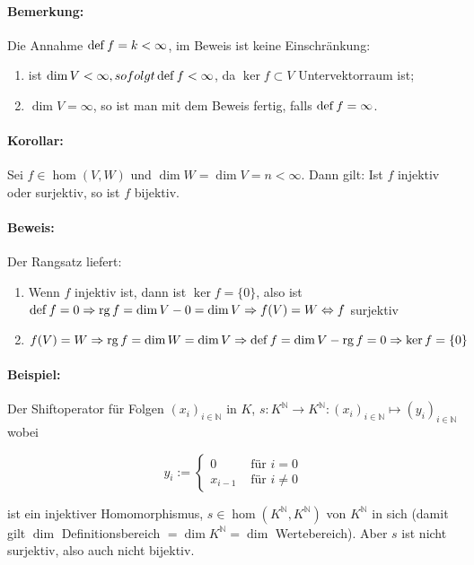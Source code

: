 \paragraph{Bemerkung: }
	Die Annahme $\operatorname{def} f = k<\infty$, im Beweis ist keine Einschränkung:
	\begin{enumerate}
		\item ist $\dim V < \infty, so folgt \operatorname{def} f<\infty$, da $\ker f\subset V$ Untervektorraum ist;			
		\item $\dim V = \infty$, so ist man mit dem Beweis fertig, falls $\operatorname{def} f = \infty$.
	\end{enumerate}
			
\paragraph{Korollar: } 
	Sei $f\in \hom(V,W)$ und $\dim W = \dim V = n<\infty$.
	Dann gilt: Ist $f$ injektiv oder surjektiv, so ist $f$ bijektiv.
	
\paragraph{Beweis: } 
	Der Rangsatz liefert:
	\begin{enumerate}
		\item Wenn $ f $ injektiv ist, dann ist $\ker f = \{{0\}}$, also ist $ \operatorname{def} f = 0 \Rightarrow \operatorname{rg} f = \dim V-0 = \dim V \Rightarrow f(V) = W \Leftrightarrow f$ surjektiv
		\item $f(V) = W \Rightarrow \operatorname{rg} f = \dim W = \dim V \Rightarrow \operatorname{def} f= \dim V - \operatorname{rg} f=0 \Rightarrow \ker f = \{{0}\}$
	\end{enumerate}
	
\paragraph{Beispiel: }
	Der Shiftoperator für Folgen $(x_i)_{i\in \mathbb{N}}$ in $K$, $s: K^{\mathbb{N}} \to K^{\mathbb{N}}: (x_i)_{i\in \mathbb{N}} \mapsto (y_i)_{i\in \mathbb{N}}$ wobei
	
	\begin{equation*}
		y_i :=
		\begin{cases}
			0 &\text{ für } i = 0\\
			x_{i-1} &\text{ für } i \neq 0
		\end{cases}
	\end{equation*}
			
	ist ein injektiver Homomorphismus, $s\in \hom(K^\mathbb{N},K^\mathbb{N})$ von $K^\mathbb{N}$ in sich (damit gilt $\dim $ Definitionsbereich $= \dim K^\mathbb{N}= \dim$ Wertebereich). Aber $s$ ist nicht surjektiv, also auch nicht bijektiv.
	
